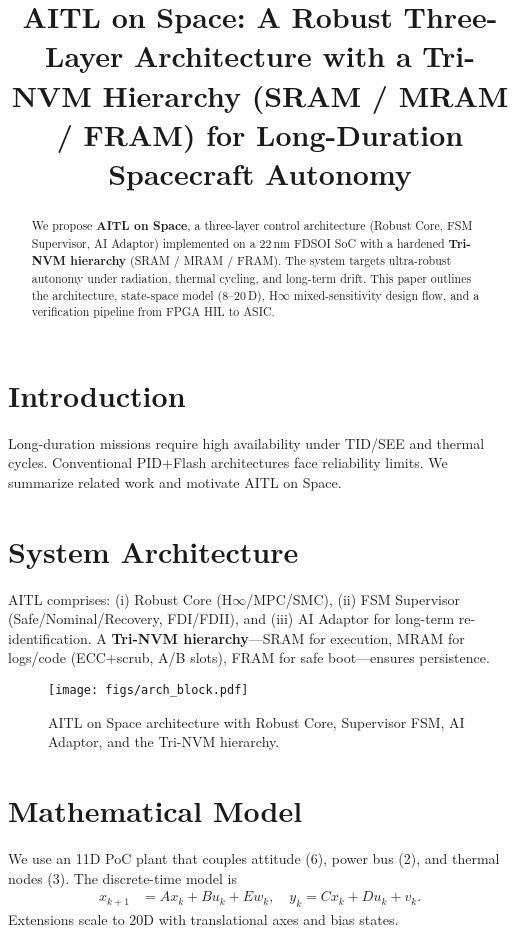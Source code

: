 \documentclass[conference]{IEEEtran}
\title{AITL on Space: A Robust Three-Layer Architecture with a Tri-NVM Hierarchy (SRAM / MRAM / FRAM) for Long-Duration Spacecraft Autonomy}
\author{%
  \IEEEauthorblockN{Shinichi Samizo}
  \IEEEauthorblockA{Independent Semiconductor Researcher\\
  Former Engineer at Seiko Epson Corporation\\
  Email: \href{mailto:shin3t72@gmail.com}{shin3t72@gmail.com}\\
  GitHub: \url{https://github.com/Samizo-AITL}}%
}
\begin{document}
\maketitle

\begin{abstract}
We propose \textbf{AITL on Space}, a three-layer control architecture (Robust Core, FSM Supervisor, AI Adaptor) implemented on a 22\,nm FDSOI SoC with a hardened \textbf{Tri-NVM hierarchy} (SRAM / MRAM / FRAM). The system targets ultra-robust autonomy under radiation, thermal cycling, and long-term drift. This paper outlines the architecture, state-space model (8--20\,D), H$\infty$ mixed-sensitivity design flow, and a verification pipeline from FPGA HIL to ASIC.
\end{abstract}

\section{Introduction}
Long-duration missions require high availability under TID/SEE and thermal cycles. Conventional PID+Flash architectures face reliability limits. We summarize related work and motivate AITL on Space.

\section{System Architecture}
AITL comprises: (i) Robust Core (H$\infty$/MPC/SMC), (ii) FSM Supervisor (Safe/Nominal/Recovery, FDI/FDII), and (iii) AI Adaptor for long-term re-identification. A \textbf{Tri-NVM hierarchy}---SRAM for execution, MRAM for logs/code (ECC+scrub, A/B slots), FRAM for safe boot---ensures persistence.

\begin{figure}[t]
  \centering
  \texttt{[image: figs/arch\_block.pdf]}
  \caption{AITL on Space architecture with Robust Core, Supervisor FSM, AI Adaptor, and the Tri-NVM hierarchy.}
  \label{fig:arch_block}
\end{figure}

\section{Mathematical Model}
We use an 11D PoC plant that couples attitude (6), power bus (2), and thermal nodes (3). The discrete-time model is
\begin{align}
x_{k+1} &= A x_k + B u_k + E w_k, \quad
y_k = C x_k + D u_k + v_k.
\end{align}
Extensions scale to 20D with translational axes and bias states.
\end{document}
